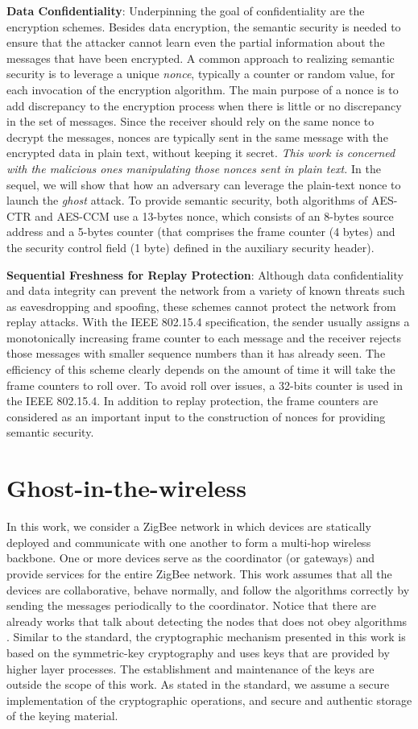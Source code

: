 \documentclass[10pt,journal,cspaper,compsoc]{IEEEtran}
\begin{document}
{\bf Data Confidentiality}:
Underpinning the goal of confidentiality are the encryption schemes. Besides data encryption, the semantic security is needed to ensure that the attacker cannot learn even the partial information about the messages that have been encrypted. A common approach to realizing semantic security is to leverage a unique {\em nonce}, typically a counter or random value, for each invocation of the encryption algorithm. The main purpose of a nonce is to add discrepancy to the encryption process when there is little or no discrepancy in the set of messages. Since the receiver should rely on the same nonce to decrypt the messages, nonces are typically sent in the same message with the encrypted data in plain text, without keeping it secret. {\em This work is concerned with the malicious ones manipulating those nonces sent in plain text.} In the sequel, we will show that how an adversary can leverage the plain-text nonce to launch the {\em ghost} attack. To provide semantic security, both algorithms of AES-CTR and AES-CCM use a 13-bytes nonce, which consists of an 8-bytes source address and a 5-bytes counter (that comprises the frame counter (4 bytes) and the security control field (1 byte) defined in the auxiliary security header).

{\bf Sequential Freshness for Replay Protection}:
Although data confidentiality and data integrity can prevent the network from a variety of known threats such as eavesdropping and spoofing, these schemes cannot protect the network from replay attacks. With the IEEE 802.15.4 specification, the sender usually assigns a monotonically increasing frame counter to each message and the receiver rejects those messages with smaller sequence numbers than it has already seen. The efficiency of this scheme clearly depends on the amount of time it will take the frame counters to roll over. To avoid roll over issues, a 32-bits counter is used in the IEEE 802.15.4. In addition to replay protection, the frame counters are considered as an important input to the construction of nonces for providing semantic security.


\section{Ghost-in-the-wireless}\label{ghost}
In this work, we consider a ZigBee network in which devices are statically deployed and communicate with one another to form a multi-hop wireless backbone. One or more devices serve as the coordinator (or gateways) and provide services for the entire ZigBee network. This work assumes that all the devices are collaborative, behave normally, and follow the algorithms correctly by sending the messages periodically to the coordinator. Notice that there are already works that talk about detecting the nodes that does not obey algorithms \cite{DEVU}. Similar to the standard, the cryptographic mechanism presented in this work is based on the symmetric-key cryptography and uses keys that are provided by higher layer processes. The establishment and maintenance of the keys are outside the scope of this work. As stated in the standard, we assume a secure implementation of the cryptographic operations, and secure and authentic storage of the keying material.
\end{document}

